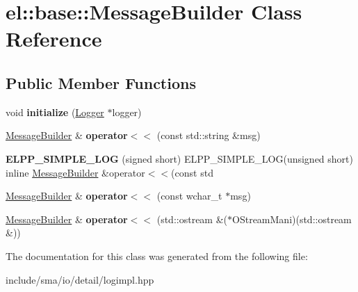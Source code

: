 \hypertarget{classel_1_1base_1_1MessageBuilder}{\section{el\-:\-:base\-:\-:Message\-Builder Class Reference}
\label{classel_1_1base_1_1MessageBuilder}
}
\subsection*{Public Member Functions}
\begin{DoxyCompactItemize}
\item 
\hypertarget{classel_1_1base_1_1MessageBuilder_a61729d9b620eb7b3e6ac1af69364553c}{void {\bfseries initialize} (\hyperlink{classel_1_1Logger}{Logger} $\ast$logger)}\label{classel_1_1base_1_1MessageBuilder_a61729d9b620eb7b3e6ac1af69364553c}

\item 
\hypertarget{classel_1_1base_1_1MessageBuilder_a740a968d7f2901d49a2e1c348cfea7bf}{\hyperlink{classel_1_1base_1_1MessageBuilder}{Message\-Builder} \& {\bfseries operator$<$$<$} (const std\-::string \&msg)}\label{classel_1_1base_1_1MessageBuilder_a740a968d7f2901d49a2e1c348cfea7bf}

\item 
\hypertarget{classel_1_1base_1_1MessageBuilder_a3397469a83257b3580624bdfbd9d7ac7}{{\bfseries E\-L\-P\-P\-\_\-\-S\-I\-M\-P\-L\-E\-\_\-\-L\-O\-G} (signed short) E\-L\-P\-P\-\_\-\-S\-I\-M\-P\-L\-E\-\_\-\-L\-O\-G(unsigned short) inline \hyperlink{classel_1_1base_1_1MessageBuilder}{Message\-Builder} \&operator$<$$<$(const std}\label{classel_1_1base_1_1MessageBuilder_a3397469a83257b3580624bdfbd9d7ac7}

\item 
\hypertarget{classel_1_1base_1_1MessageBuilder_a42c2a21a6bebb2ad52d22da054cd8f49}{\hyperlink{classel_1_1base_1_1MessageBuilder}{Message\-Builder} \& {\bfseries operator$<$$<$} (const wchar\-\_\-t $\ast$msg)}\label{classel_1_1base_1_1MessageBuilder_a42c2a21a6bebb2ad52d22da054cd8f49}

\item 
\hypertarget{classel_1_1base_1_1MessageBuilder_a884b9fd5f742f5fa25bbc78d3415a674}{\hyperlink{classel_1_1base_1_1MessageBuilder}{Message\-Builder} \& {\bfseries operator$<$$<$} (std\-::ostream \&($\ast$O\-Stream\-Mani)(std\-::ostream \&))}\label{classel_1_1base_1_1MessageBuilder_a884b9fd5f742f5fa25bbc78d3415a674}

\end{DoxyCompactItemize}


The documentation for this class was generated from the following file\-:\begin{DoxyCompactItemize}
\item 
include/sma/io/detail/logimpl.\-hpp\end{DoxyCompactItemize}

